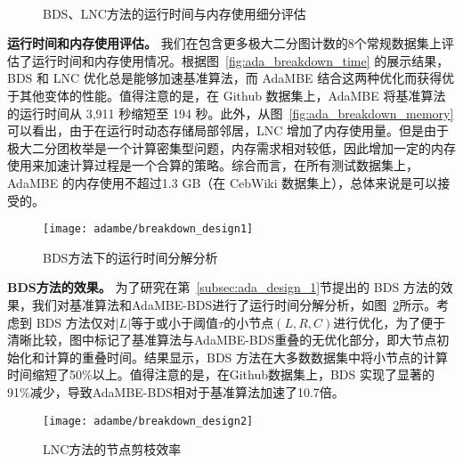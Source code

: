 \begin{figure} [H]
  \centering
	\\

  \caption{BDS、LNC方法的运行时间与内存使用细分评估}
  \label{fig:ada_breakdown}
\end{figure}

\textbf{运行时间和内存使用评估。} 我们在包含更多极大二分图计数的8个常规数据集上评估了运行时间和内存使用情况。根据图~\ref{fig:ada_breakdown_time} 的展示结果，BDS 和 LNC 优化总是能够加速基准算法，而 AdaMBE 结合这两种优化而获得优于其他变体的性能。值得注意的是，在 Github 数据集上，AdaMBE 将基准算法的运行时间从 3,911 秒缩短至 194 秒。此外，从图~\ref{fig:ada_breakdown_memory} 可以看出，由于在运行时动态存储局部邻居，LNC 增加了内存使用量。但是由于极大二分团枚举是一个计算密集型问题，内存需求相对较低，因此增加一定的内存使用来加速计算过程是一个合算的策略。综合而言，在所有测试数据集上，AdaMBE 的内存使用不超过1.3 GB（在 CebWiki 数据集上），总体来说是可以接受的。

\begin{figure} [H]
	\centering
	\texttt{[image: adambe/breakdown\_design1]}
	\caption{BDS方法下的运行时间分解分析}

	\label{fig:ada_breakdown_design1}
\end{figure}

\textbf{BDS方法的效果。} 为了研究在第~\ref{subsec:ada_design_1}节提出的 BDS 方法的效果，我们对基准算法和AdaMBE-BDS进行了运行时间分解分析，如图~\ref{fig:ada_breakdown_design1}所示。考虑到 BDS 方法仅对$|L|$等于或小于阈值$\tau$的小节点$(L, R, C)$进行优化，为了便于清晰比较，图中标记了基准算法与AdaMBE-BDS重叠的无优化部分，即大节点初始化和计算的重叠时间。结果显示，BDS 方法在大多数数据集中将小节点的计算时间缩短了50\%以上。值得注意的是，在Github数据集上，BDS 实现了显著的91\%减少，导致AdaMBE-BDS相对于基准算法加速了10.7倍。

\begin{figure} [H]
	\centering
	\texttt{[image: adambe/breakdown\_design2]}
	\caption{LNC方法的节点剪枝效率}

	\label{fig:ada_breakdown_design2}
\end{figure}

